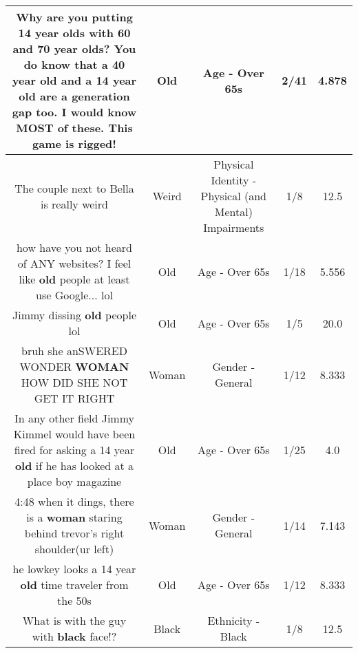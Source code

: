 \documentclass[11pt]{article}
\newlength\mylength
\begin{document}
\begin{center}
\begin{longtable}{|C{.65\mylength}|C{.30\mylength}|C{.12\mylength}|C{.12\mylength}|C{.12\mylength}|}
  \small Why are you putting 14 year olds with 60 and 70 year olds?  You do know that a 40 year \textbf{old} and a 14 year \textbf{old} are a generation gap too.  I would know MOST of these.  This game is rigged!\normalsize   & Old & Age - Over 65s & 2/41 & 4.878 \\  \hline
  \small The couple next to Bella is really weird\normalsize   & Weird & Physical Identity - Physical (and Mental) Impairments & 1/8 & 12.5 \\  \hline
  \small how have you not heard of ANY websites? I feel like \textbf{old} people at least use Google... lol\normalsize   & Old & Age - Over 65s & 1/18 & 5.556 \\  \hline
  \small Jimmy dissing \textbf{old} people lol\normalsize   & Old & Age - Over 65s & 1/5 & 20.0 \\  \hline
  \small bruh she anSWERED WONDER \textbf{WOMAN} HOW DID SHE NOT GET IT RIGHT\normalsize   & Woman & Gender - General & 1/12 & 8.333 \\  \hline
  \small In any other field Jimmy Kimmel would have been fired for asking a 14 year \textbf{old} if he has looked at a place boy magazine\normalsize   & Old & Age - Over 65s & 1/25 & 4.0 \\  \hline
  \small 4:48 when it dings, there is a \textbf{woman} staring behind trevor's right shoulder(ur left)\normalsize   & Woman & Gender - General & 1/14 & 7.143 \\  \hline
  \small he lowkey looks a 14 year \textbf{old}  time traveler from the 50s\normalsize   & Old & Age - Over 65s & 1/12 & 8.333 \\  \hline
  \small What is with the guy with \textbf{black} face!?\normalsize   & Black & Ethnicity - Black & 1/8 & 12.5 \\  \hline

\end{longtable}
\end{center}
\end{document}
